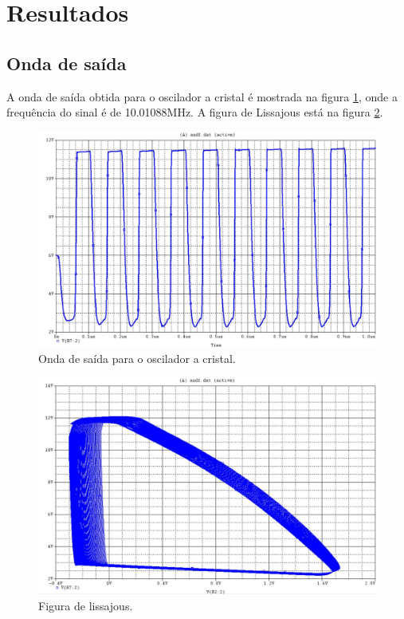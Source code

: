 \newpage
\section{Resultados}

\subsection{Onda de saída}

A onda de saída obtida para o oscilador a cristal é mostrada na figura \ref{f_saida}, onde a frequência do sinal é de 10.01088MHz. A figura de Lissajous está na figura \ref{f_lissajous}.


\begin{figure}[H]
	\centering
	\includegraphics[scale=0.3]{Imagens/saida.jpg}
	\caption{Onda de saída para o oscilador a cristal.}
	\label{f_saida}
\end{figure}

\begin{figure}[H]
	\centering
	\includegraphics[scale=0.3]{Imagens/lissajous.jpg}
	\caption{Figura de lissajous.}
	\label{f_lissajous}
\end{figure}


